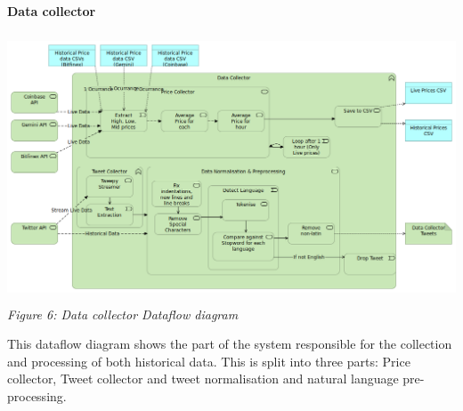 \documentclass[oneside, 12pt]{article}
\begin{document}
		\textbf{Data collector}
		\begin{center}
			\includegraphics[width=15cm,height=8cm]{images/Data_Collector.png}
			\textit{Figure 6: Data collector Dataflow diagram}
		\end{center}
		This dataflow diagram shows the part of the system responsible for the collection and processing of both historical data. This is split into three parts: Price collector, Tweet collector and tweet normalisation and natural language pre-processing.
\end{document}
